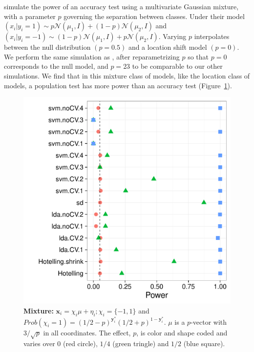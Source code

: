 \documentclass[12pt,a4paper]{article}
\theoremstyle{definition}
\newcommand{\set}[1]{\{ #1 \}} %
\newcommand{\prob}[1]{Prob( #1 )} %
\newcommand{\rv}[1]{\mathbf{#1}} %
\newcommand{\x}{\rv x} %
\newcommand{\y}{\rv y} %
\newcommand{\gauss}[1]{\mathcal{N}\left(#1\right)} %
\begin{document}
\cite{golland_permutation_2005} simulate the power of an accuracy test using a multivariate Gaussian mixture, with a parameter $p$ governing the separation between classes. 
Under their model 
$(x_i|y_i=1) \sim p \gauss{\mu_1,I}+ (1-p) \gauss{\mu_2,I}$ 
and 
$(x_i|y_i=-1) \sim (1-p) \gauss{\mu_1,I}+ p \gauss{\mu_2,I}$.
Varying $p$ interpolates between the null distribution $(p=0.5)$ and a location shift model $(p=0)$. 
We perform the same simulation as \cite{golland_permutation_2005}, after reparametrizing $p$ so that $p=0$ corresponds to the null model, and $p=23$ to be comparable to our other simulations.
We find that in this mixture class of models, like the location class of models, a population test has more power than an accuracy test (Figure~\ref{fig:golland}).


\begin{figure}[ht]
\centering
	  \includegraphics[width=0.8\linewidth]{"art/2016-08-08 07:33:05"}
	  \caption{\textbf{Mixture:} $\x_i = \chi_i \mu + \eta_i; \chi_i = \set{-1,1}$ and $\prob{\chi_i=1}=(1/2-p)^{\y^*_i}  (1/2+p)^{1-\y^*_i}$. $\mu$ is a $p$-vector with $3/\sqrt{p}$ in all coordinates.
	  The effect, $p$, is color and shape coded and varies over $0$ (red circle), $1/4$ (green tringle) and $1/2$ (blue square). }
	\label{fig:golland}
\end{figure}




\end{document}
